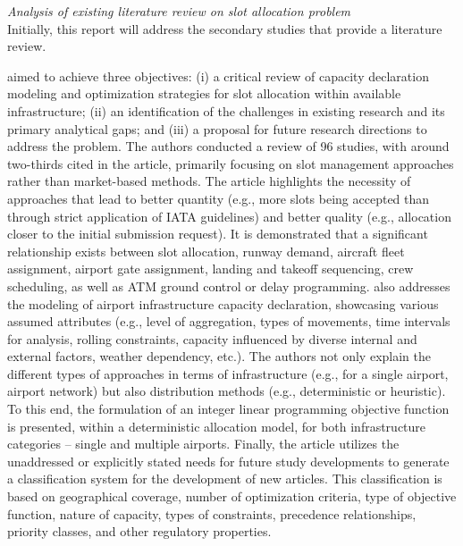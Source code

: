 \textit{Analysis of existing literature review on slot allocation problem}
\\

Initially, this report will address the secondary studies that provide a literature review.

 aimed to achieve three objectives: (i) a critical review of capacity declaration modeling and optimization strategies for slot allocation within available infrastructure; (ii) an identification of the challenges in existing research and its primary analytical gaps; and (iii) a proposal for future research directions to address the problem. The authors conducted a review of 96 studies, with around two-thirds cited in the article, primarily focusing on slot management approaches rather than market-based methods. The article highlights the necessity of approaches that lead to better quantity (e.g., more slots being accepted than through strict application of \acrshort{IATA} guidelines) and better quality (e.g., allocation closer to the initial submission request). It is demonstrated that a significant relationship exists between slot allocation, runway demand, aircraft fleet assignment, airport gate assignment, landing and takeoff sequencing, crew scheduling, as well as \acrshort{ATM} ground control or delay programming.  also addresses the modeling of airport infrastructure capacity declaration, showcasing various assumed attributes (e.g., level of aggregation, types of movements, time intervals for analysis, rolling constraints, capacity influenced by diverse internal and external factors, weather dependency, etc.). The authors not only explain the different types of approaches in terms of infrastructure (e.g., for a single airport, airport network) but also distribution methods (e.g., deterministic or heuristic). To this end, the formulation of an integer linear programming objective function is presented, within a deterministic allocation model, for both infrastructure categories – single and multiple airports. Finally, the article utilizes the unaddressed or explicitly stated needs for future study developments to generate a classification system for the development of new articles. This classification is based on geographical coverage, number of optimization criteria, type of objective function, nature of capacity, types of constraints, precedence relationships, priority classes, and other regulatory properties.

